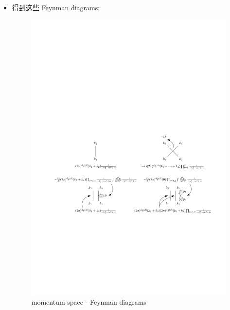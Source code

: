 \begin{itemize}
	\item 得到这些 Feynman diagrams:
	
	\begin{figure}[H]
		\centering
		\includegraphics[scale=1]{figures/collision between particles - Feynman diagrams (in momentum space).pdf}
		\caption{momentum space - Feynman diagrams}
		\label{figure 3.3}
	\end{figure}
	

\end{itemize}
